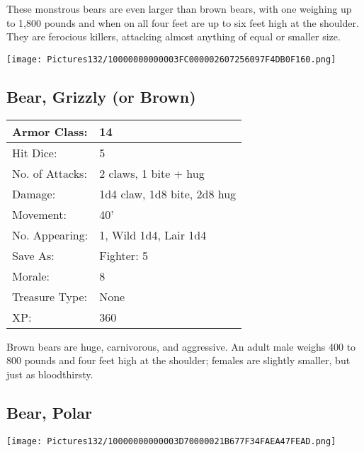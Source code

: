 \documentclass[a4paper,twoside,openany,10pt]{book}
\begin{document}
\begin{multicols}{2}
These monstrous bears are even larger than brown bears, with one weighing up to 1,800 pounds and when on all four feet are up to six feet high at the shoulder. They are ferocious killers, attacking almost anything of equal or smaller size.

\begin{center}
	\texttt{[image: Pictures132/10000000000003FC000002607256097F4DB0F160.png]}
\end{center}

\subsection*{Bear, Grizzly (or Brown)}\label{bear-grizzly-or-brown}

\begin{tabularx}{0.48\textwidth}{@{}lX@{}}
Armor Class: & 14 \\\hline
Hit Dice: & 5 \\\hline
No. of Attacks: & 2 claws, 1 bite + hug \\\hline
Damage: & 1d4 claw, 1d8 bite, 2d8 hug \\\hline
Movement: & 40' \\\hline
No. Appearing: & 1, Wild 1d4, Lair 1d4 \\\hline
Save As: & Fighter: 5 \\\hline
Morale: & 8 \\\hline
Treasure Type: & None \\\hline
XP: & 360 \\\hline
\end{tabularx}

Brown bears are huge, carnivorous, and aggressive. An adult male weighs 400 to 800 pounds and four feet high at the shoulder; females are slightly smaller, but just as bloodthirsty.

\subsection*{Bear, Polar}\label{bear-polar}


\begin{center}
	\texttt{[image: Pictures132/10000000000003D70000021B677F34FAEA47FEAD.png]}
\end{center}


\end{multicols}
\end{document}
